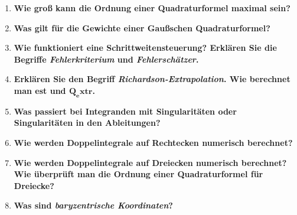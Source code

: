 \begin{enumerate}
		\item \textbf{Wie groß kann die Ordnung einer Quadraturformel maximal sein?} \\
		
		\item \textbf{Was gilt für die Gewichte einer Gaußschen Quadraturformel?} \\
		
		\item \textbf{Wie funktioniert eine Schrittweitensteuerung? Erklären Sie die Begriffe \textit{Fehlerkriterium} und \textit{Fehlerschätzer}.} \\
		
		\item \textbf{Erklären Sie den Begriff \textit{Richardson-Extrapolation}. Wie berechnet man est und $\pmb{Q_extr}$.} \\
		
		\item \textbf{Was passiert bei Integranden mit Singularitäten oder Singularitäten in den Ableitungen?} \\
		
		\item \textbf{Wie werden Doppelintegrale auf Rechtecken numerisch berechnet?} \\
		
		\item \textbf{Wie werden Doppelintegrale auf Dreiecken numerisch berechnet? Wie überprüft man die Ordnung einer Quadraturformel für Dreiecke?} \\
		
		\item \textbf{Was sind \textit{baryzentrische Koordinaten}?} \\
		
	\end{enumerate}